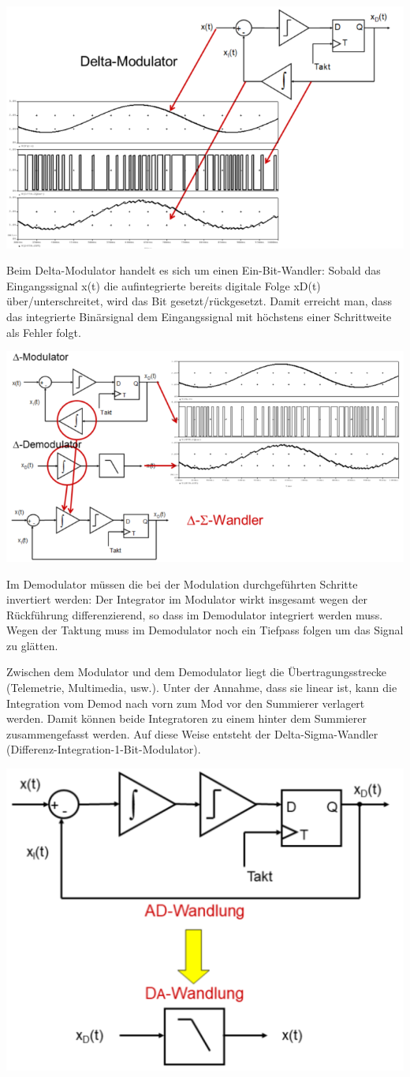 \documentclass[a4paper]{article}
\begin{document}
\begin{multicols}{3}
  \begin{itemize*}
    \item \includegraphics[width=.5\linewidth]{Assets/Biosignalverarbeitung-Delta-Sigma-Wandlung.png}
    \item Beim Delta-Modulator handelt es sich um einen Ein-Bit-Wandler: Sobald das Eingangssignal x(t) die aufintegrierte bereits digitale Folge xD(t) über/unterschreitet, wird das Bit gesetzt/rückgesetzt. Damit erreicht man, dass das integrierte Binärsignal dem Eingangssignal mit höchstens einer Schrittweite als Fehler folgt.
    \item \includegraphics[width=.5\linewidth]{Assets/Biosignalverarbeitung-Delta-Sigma-Wandlung-2.png}
    \item Im Demodulator müssen die bei der Modulation durchgeführten Schritte invertiert werden: Der Integrator im Modulator wirkt insgesamt wegen der Rückführung differenzierend, so dass im Demodulator integriert werden muss. Wegen der Taktung muss im Demodulator noch ein Tiefpass folgen um das Signal zu glätten.
    \item Zwischen dem Modulator und dem Demodulator liegt die Übertragungsstrecke (Telemetrie, Multimedia, usw.). Unter der Annahme, dass sie linear ist, kann die Integration vom Demod nach vorn zum Mod vor den Summierer verlagert werden. Damit können beide Integratoren zu einem hinter dem Summierer zusammengefasst werden. Auf diese Weise entsteht der Delta-Sigma-Wandler (Differenz-Integration-1-Bit-Modulator).
    \item \includegraphics[width=.5\linewidth]{Assets/Biosignalverarbeitung-Delta-Sigma-Wandlung-3.png}

\end{itemize*}
\end{multicols}
\end{document}
